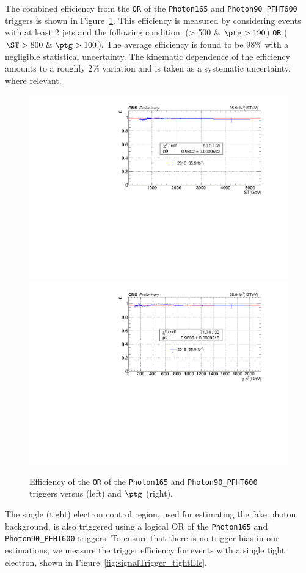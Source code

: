 The combined efficiency from the \texttt{OR} of the \texttt{Photon165} and 
\texttt{Photon90\_PFHT600} 
triggers is shown in Figure~\ref{fig:signalTriggers_OR}. This efficiency is measured by considering events with at least 2 jets and the following condition: (\ST > 500 \& $\ptg>190$) \texttt{OR} ($\ST > 800\ \& \ \ptg>100$).  The average efficiency
is found to be 98\% with a negligible statistical uncertainty.  The kinematic
dependence of the efficiency amounts to a roughly 2\% variation and is taken
as a systematic uncertainty, where relevant.

\begin{figure}[htbp!]
  \centering
  \includegraphics[width=0.48\linewidth]{../Figures/Chap3/triggers/signalTriggerEff_ST.pdf}
  \includegraphics[width=0.48\linewidth]{../Figures/Chap3/triggers/signalTriggerEff_photonPt.pdf}
  \captionsetup{width=.9\linewidth}
  \caption{Efficiency of the \texttt{OR} of the \texttt{Photon165} and \texttt{Photon90\_PFHT600} triggers versus \ST (left) and $\ptg$ (right).}
  \label{fig:signalTriggers_OR}
\end{figure}

The single (tight) electron control region, used for estimating the fake photon background, 
is also triggered using a logical OR of the \texttt{Photon165} and \texttt{Photon90\_PFHT600}
triggers. To ensure that there is no trigger bias in our estimations, we measure
the trigger efficiency for events with a single tight electron, shown in Figure~\ref{fig:signalTrigger_tightEle}.

